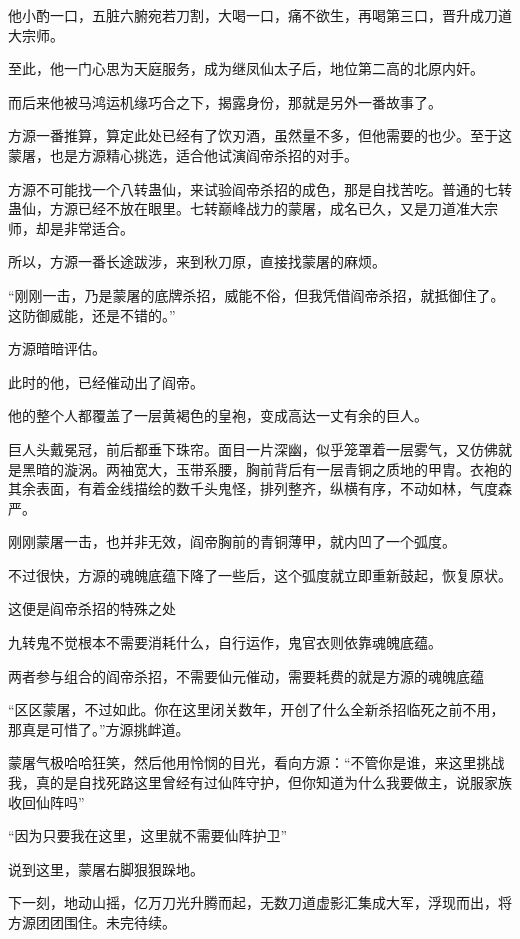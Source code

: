 \begin{this_body}
他小酌一口，五脏六腑宛若刀割，大喝一口，痛不欲生，再喝第三口，晋升成刀道大宗师。

至此，他一门心思为天庭服务，成为继凤仙太子后，地位第二高的北原内奸。

而后来他被马鸿运机缘巧合之下，揭露身份，那就是另外一番故事了。

方源一番推算，算定此处已经有了饮刃酒，虽然量不多，但他需要的也少。至于这蒙屠，也是方源精心挑选，适合他试演阎帝杀招的对手。

方源不可能找一个八转蛊仙，来试验阎帝杀招的成色，那是自找苦吃。普通的七转蛊仙，方源已经不放在眼里。七转巅峰战力的蒙屠，成名已久，又是刀道准大宗师，却是非常适合。

所以，方源一番长途跋涉，来到秋刀原，直接找蒙屠的麻烦。

“刚刚一击，乃是蒙屠的底牌杀招，威能不俗，但我凭借阎帝杀招，就抵御住了。这防御威能，还是不错的。”

方源暗暗评估。

此时的他，已经催动出了阎帝。

他的整个人都覆盖了一层黄褐色的皇袍，变成高达一丈有余的巨人。

巨人头戴冕冠，前后都垂下珠帘。面目一片深幽，似乎笼罩着一层雾气，又仿佛就是黑暗的漩涡。两袖宽大，玉带系腰，胸前背后有一层青铜之质地的甲胄。衣袍的其余表面，有着金线描绘的数千头鬼怪，排列整齐，纵横有序，不动如林，气度森严。

刚刚蒙屠一击，也并非无效，阎帝胸前的青铜薄甲，就内凹了一个弧度。

不过很快，方源的魂魄底蕴下降了一些后，这个弧度就立即重新鼓起，恢复原状。

这便是阎帝杀招的特殊之处

九转鬼不觉根本不需要消耗什么，自行运作，鬼官衣则依靠魂魄底蕴。

两者参与组合的阎帝杀招，不需要仙元催动，需要耗费的就是方源的魂魄底蕴

“区区蒙屠，不过如此。你在这里闭关数年，开创了什么全新杀招临死之前不用，那真是可惜了。”方源挑衅道。

蒙屠气极哈哈狂笑，然后他用怜悯的目光，看向方源：“不管你是谁，来这里挑战我，真的是自找死路这里曾经有过仙阵守护，但你知道为什么我要做主，说服家族收回仙阵吗”

“因为只要我在这里，这里就不需要仙阵护卫”

说到这里，蒙屠右脚狠狠跺地。

下一刻，地动山摇，亿万刀光升腾而起，无数刀道虚影汇集成大军，浮现而出，将方源团团围住。未完待续。

\end{this_body}

